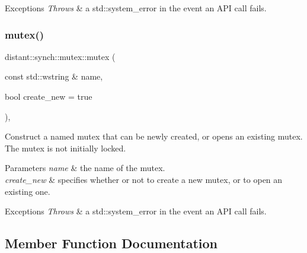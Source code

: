 \begin{DoxyExceptions}{Exceptions}
{\em Throws} & a std\+::system\+\_\+error in the event an A\+PI call fails. \\
\hline
\end{DoxyExceptions}
\mbox{\label{classdistant_1_1synch_1_1mutex_aa6a362d74dfe7447353d2d237e52a5f7}} 
\subsubsection{\texorpdfstring{mutex()}{mutex()}\hspace{0.1cm}{\footnotesize\ttfamily [2/2]}}
{\footnotesize\ttfamily distant\+::synch\+::mutex\+::mutex (\begin{DoxyParamCaption}\item[{const std\+::wstring \&}]{name,  }\item[{bool}]{create\+\_\+new = {\ttfamily true} }\end{DoxyParamCaption})\hspace{0.3cm}{\ttfamily [inline]}, {\ttfamily [explicit]}}



Construct a named mutex that can be newly created, or opens an existing mutex. The mutex is not initially locked. 


\begin{DoxyParams}{Parameters}
{\em name} & the name of the mutex. \\
\hline
{\em create\+\_\+new} & specifies whether or not to create a new mutex, or to open an existing one. \\
\hline
\end{DoxyParams}

\begin{DoxyExceptions}{Exceptions}
{\em Throws} & a std\+::system\+\_\+error in the event an A\+PI call fails. \\
\hline
\end{DoxyExceptions}


\subsection{Member Function Documentation}
\mbox{\label{classdistant_1_1synch_1_1mutex_a8f590ad6a717569b87f4c4ab1b9d24c1}} 
